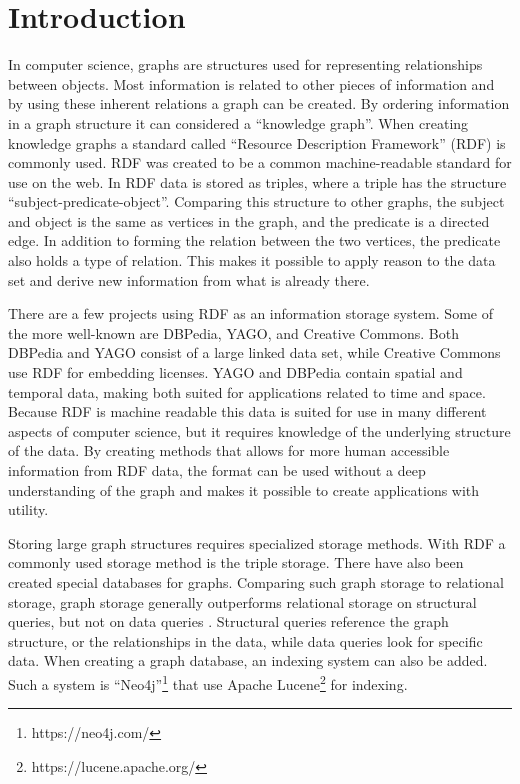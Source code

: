 \chapter{Introduction}
\label{cha:Introduction}
In computer science, graphs are structures used for representing relationships between objects. Most information is related to other pieces of information and by using these inherent relations a graph can be created. By ordering information in a graph structure it can considered a ``knowledge graph''. When creating knowledge graphs a standard called ``Resource Description Framework'' (RDF) is commonly used. RDF was created to be a common machine-readable standard for use on the web. In RDF data is stored as triples, where a triple has the structure ``subject-predicate-object''. Comparing this structure to other graphs, the subject and object is the same as vertices in the graph, and the predicate is a directed edge. In addition to forming the relation between the two vertices, the predicate also holds a type of relation. This makes it possible to apply reason to the data set and derive new information from what is already there.

There are a few projects using RDF as an information storage system. Some of the more well-known are DBPedia\cite{dbpedia}, YAGO\cite{yago}, and Creative Commons. Both DBPedia and YAGO consist of a large linked data set, while Creative Commons use RDF for embedding licenses. YAGO and DBPedia contain spatial and temporal data, making both suited for applications related to time and space. Because RDF is machine readable this data is suited for use in many different aspects of computer science, but it requires knowledge of the underlying structure of the data. By creating methods that allows for more human accessible information from RDF data, the format can be used without a deep understanding of the graph and makes it possible to create applications with utility.

Storing large graph structures requires specialized storage methods. With RDF a commonly used storage method is the triple storage. There have also been created special databases for graphs. Comparing such graph storage to relational storage, graph storage generally outperforms relational storage on structural queries, but not on data queries \cite{AComparisonOfGraphAndRelDB}. Structural queries reference the graph structure, or the relationships in the data, while data queries look for specific data. When creating a graph database, an indexing system can also be added. Such a system is ``Neo4j''\footnote{https://neo4j.com/} that use Apache Lucene\footnote{https://lucene.apache.org/} for indexing.

